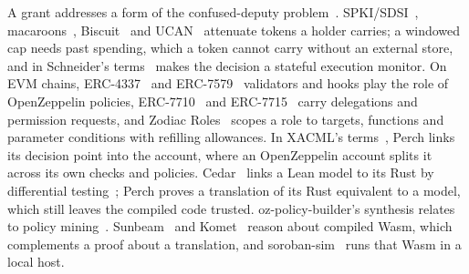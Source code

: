 A grant addresses a form of the confused-deputy problem~\cite{confused-deputy}.
SPKI/SDSI~\cite{spki}, macaroons~\cite{macaroons}, Biscuit~\cite{biscuit} and
UCAN~\cite{ucan} attenuate tokens a holder carries; a windowed cap needs past
spending, which a token cannot carry without an external store, and in
Schneider's terms~\cite{schneider-enforceable} makes the decision a stateful
execution monitor. On EVM chains, ERC-4337~\cite{erc4337} and ERC-7579~\cite{erc7579} validators
and hooks play the role of OpenZeppelin policies, ERC-7710~\cite{erc7710} and
ERC-7715~\cite{erc7715} carry delegations and permission requests, and Zodiac
Roles~\cite{zodiac-roles} scopes a role to targets, functions and parameter
conditions with refilling allowances. In XACML's terms~\cite{xacml3}, Perch links its decision point into the
account, where an OpenZeppelin account splits it across its own checks and
policies. Cedar~\cite{cedar} links a Lean model to its Rust by
differential testing~\cite{cedar-vgd}; Perch proves a translation of its Rust
equivalent to a model, which still leaves the compiled code trusted.
oz-policy-builder's synthesis relates to policy
mining~\cite{xu-stoller-mining}. Sunbeam~\cite{sunbeam} and Komet~\cite{komet}
reason about compiled Wasm, which complements a proof about a translation, and
soroban-sim~ runs that Wasm in a local host.
